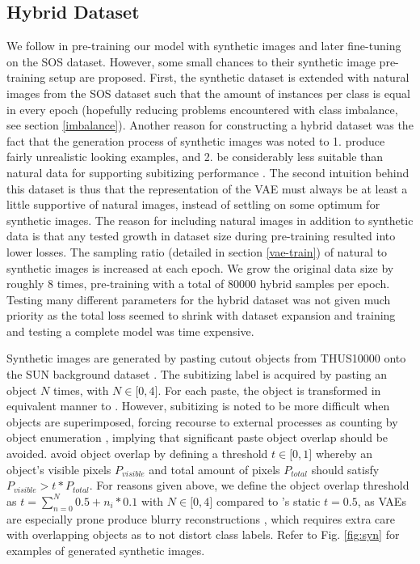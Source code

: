 \documentclass[twocolumn]{article}
\begin{document}
\hypertarget{hybrid}{%
\subsection{Hybrid Dataset}\label{hybrid}}

We follow \citet{zhang2016salient} in pre-training our model with
synthetic images and later fine-tuning on the SOS dataset. However, some
small chances to their synthetic image pre-training setup are proposed.
First, the synthetic dataset is extended with natural images from the
SOS dataset such that the amount of instances per class is equal in every epoch (hopefully reducing problems encountered with class
imbalance, see section \ref{imbalance}). Another
reason for constructing a hybrid dataset was the fact that the
generation process of synthetic images was noted to 1. produce fairly
unrealistic looking examples, and 2. be considerably less suitable than
natural data for supporting subitizing performance
\citep{zhang2016salient}. The second intuition behind this dataset is
thus that the representation of the VAE must always be at least a little
supportive of natural images, instead of settling on some optimum for
synthetic images. The reason for including natural images in addition to synthetic data is that
any tested growth in dataset size during pre-training resulted into
lower losses. 
The sampling ratio (detailed in section \ref{vae-train}) of natural to synthetic images is increased at each epoch. We grow the
original data size by roughly 8 times, pre-training with a total of
80000 hybrid samples per epoch. Testing many different parameters for
the hybrid dataset was not given much priority as the total loss seemed
to shrink with dataset expansion and training and testing a complete model
was time expensive.

Synthetic images are generated by pasting cutout objects from THUS10000
\citep{cheng2015global} onto the SUN background dataset
\citep{xiao2010sun}. The subitizing label is acquired by pasting an
object \(N\) times, with \(N \in \lbrack0, 4\rbrack\). For each paste,
the object is transformed in equivalent manner to
\citet{zhang2016salient}. However, subitizing is noted to be more difficult
when objects are superimposed, forcing recourse to external processes as
counting by object enumeration \citep[p.~57.]{dehaene2011number},
implying that significant paste object overlap should be avoided.
\citet{zhang2016salient} avoid object overlap by defining a threshold
\(t \in \lbrack0,1\rbrack\) whereby an object's visible pixels
\(P_{visible}\) and total amount of pixels \(P_{total}\) should satisfy
\(P_{visible} > t * P_{total}\). For reasons given above, we define the
object overlap threshold as \(t = \sum_{n=0}^{N} 0.5 + n_i * 0.1\) with
\(N \in \lbrack0,4\rbrack\) compared to \citet{zhang2016salient}'s
static \(t=0.5\), as VAEs are especially prone produce blurry
reconstructions \citep{hou2017deep, larsen2015autoencoding}, which
requires extra care with overlapping objects as to not distort class
labels. Refer to Fig. \ref{fig:syn} for examples of generated synthetic images.
\end{document}

